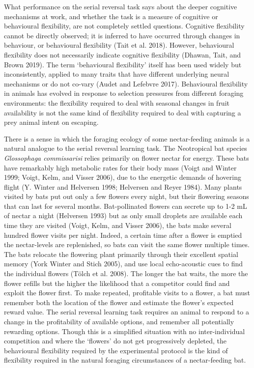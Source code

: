 \documentclass[
]{article}
\begin{document}
What performance on the serial reversal task says about the deeper cognitive mechanisms at work, and whether the task is a measure of cognitive or behavioural flexibility, are not completely settled questions. Cognitive flexibility cannot be directly observed; it is inferred to have occurred through changes in behaviour, or behavioural flexibility (Tait et al. 2018). However, behavioural flexibility does not necessarily indicate cognitive flexibility (Dhawan, Tait, and Brown 2019). The term `behavioural flexibility' itself has been used widely but inconsistently, applied to many traits that have different underlying neural mechanisms or do not co-vary (Audet and Lefebvre 2017). Behavioural flexibility in animals has evolved in response to selection pressures from different foraging environments: the flexibility required to deal with seasonal changes in fruit availability is not the same kind of flexibility required to deal with capturing a prey animal intent on escaping.

There is a sense in which the foraging ecology of some nectar-feeding animals is a natural analogue to the serial reversal learning task. The Neotropical bat species \emph{Glossophaga commissarisi} relies primarily on flower nectar for energy. These bats have remarkably high metabolic rates for their body mass (Voigt and Winter 1999; Voigt, Kelm, and Visser 2006), due to the energetic demands of hovering flight (Y. Winter and Helversen 1998; Helversen and Reyer 1984). Many plants visited by bats put out only a few flowers every night, but their flowering seasons that can last for several months. Bat-pollinated flowers can secrete up to 1-2 mL of nectar a night (Helversen 1993) but as only small droplets are available each time they are visited (Voigt, Kelm, and Visser 2006), the bats make several hundred flower visits per night. Indeed, a certain time after a flower is emptied the nectar-levels are replenished, so bats can visit the same flower multiple times. The bats relocate the flowering plant primarily through their excellent spatial memory (York Winter and Stich 2005), and use local echo-acoustic cues to find the individual flowers (Tölch et al. 2008). The longer the bat waits, the more the flower refills but the higher the likelihood that a competitor could find and exploit the flower first. To make repeated, profitable visits to a flower, a bat must remember both the location of the flower and estimate the flower's expected reward value. The serial reversal learning task requires an animal to respond to a change in the profitability of available options, and remember all potentially rewarding options. Though this is a simplified situation with no inter-individual competition and where the `flowers' do not get progressively depleted, the behavioural flexibility required by the experimental protocol is the kind of flexibility required in the natural foraging circumstances of a nectar-feeding bat.
\end{document}
